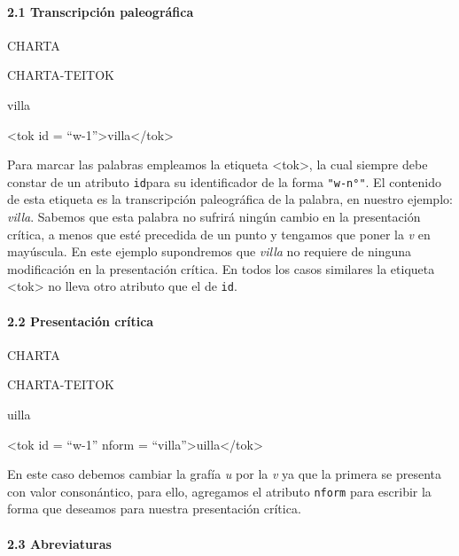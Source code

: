 \documentclass[
]{book}
\begin{document}
\hypertarget{transcripciuxf3n-paleogruxe1fica}{%
\paragraph*{2.1 Transcripción paleográfica}\label{transcripciuxf3n-paleogruxe1fica}}

CHARTA

CHARTA-TEITOK

villa

{\textless tok} {id} {=} {``w-1''}{\textgreater{}}villa{\textless/tok\textgreater{}}

Para marcar las palabras empleamos la etiqueta {\textless tok\textgreater{}}, la cual siempre debe constar de un atributo \texttt{id}para su identificador de la forma \texttt{"w-n°"}. El contenido de esta etiqueta es la transcripción paleográfica de la palabra, en nuestro ejemplo: \emph{villa}. Sabemos que esta palabra no sufrirá ningún cambio en la presentación crítica, a menos que esté precedida de un punto y tengamos que poner la \emph{v} en mayúscula. En este ejemplo supondremos que \emph{villa} no requiere de ninguna modificación en la presentación crítica. En todos los casos similares la etiqueta { \textless tok\textgreater{}} no lleva otro atributo que el de \texttt{id}.

\hypertarget{presentaciuxf3n-cruxedtica}{%
\paragraph*{2.2 Presentación crítica}\label{presentaciuxf3n-cruxedtica}}

CHARTA

CHARTA-TEITOK

uilla

{\textless tok} {id} {=} {``w-1''} {nform} {=} {``villa''}{\textgreater{}}uilla{\textless/tok\textgreater{}}

En este caso debemos cambiar la grafía \emph{u} por la \emph{v} ya que la primera se presenta con valor consonántico, para ello, agregamos el atributo \texttt{nform} para escribir la forma que deseamos para nuestra presentación crítica.

\hypertarget{abreviaturas}{%
\paragraph*{2.3 Abreviaturas}\label{abreviaturas}}
\end{document}
